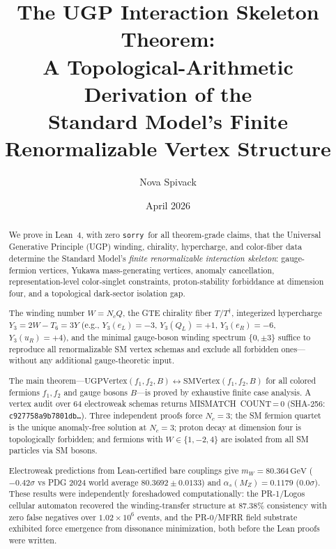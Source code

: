 \documentclass[12pt]{article}
\title{\textbf{The UGP Interaction Skeleton Theorem:\\
A Topological-Arithmetic Derivation of the\\
Standard Model's Finite Renormalizable Vertex Structure}}
\author{Nova Spivack}
\date{April 2026}
\theoremstyle{remark}
\newcommand{\sorry}{\texttt{sorry}}
\begin{document}
\maketitle
\NovaZenodoAfterTitle

\begin{abstract}
We prove in Lean~4, with zero \sorry\ for all theorem-grade claims, that the
Universal Generative Principle (UGP) winding, chirality, hypercharge, and
color-fiber data determine the Standard Model's \emph{finite renormalizable
interaction skeleton}: gauge-fermion vertices, Yukawa mass-generating vertices,
anomaly cancellation, representation-level color-singlet constraints,
proton-stability forbiddance at dimension four, and a topological dark-sector
isolation gap.

The winding number $W = N_cQ$, the GTE chirality fiber
$T/T^\dagger$, integerized hypercharge $Y_3 = 2W - T_6 = 3Y$ (e.g.,
$Y_3(e_L) = -3$, $Y_3(Q_L) = +1$, $Y_3(e_R) = -6$, $Y_3(u_R) = +4$), and
the minimal gauge-boson winding spectrum $\{0,\pm 3\}$ suffice to reproduce
all renormalizable SM vertex schemas and exclude all forbidden ones---without
any additional gauge-theoretic input.

The main theorem---$\mathrm{UGPVertex}(f_1,f_2,B) \leftrightarrow
\mathrm{SMVertex}(f_1,f_2,B)$ for all colored fermions $f_1,f_2$ and gauge
bosons $B$---is proved by exhaustive finite case analysis.  A vertex audit
over 64 electroweak schemas returns MISMATCH~COUNT\,=\,0 (SHA-256:
\texttt{c927758a9b7801db\ldots}).  Three independent proofs force $N_c = 3$;
the SM fermion quartet is the unique anomaly-free solution at $N_c = 3$; proton
decay at dimension four is topologically forbidden; and fermions with $W \in
\{1,-2,4\}$ are isolated from all SM particles via SM bosons.

Electroweak predictions from Lean-certified bare couplings give
$m_W = 80.364\,\mathrm{GeV}$ ($-0.42\sigma$ vs PDG 2024 world average
$80.3692 \pm 0.0133$) and $\alpha_s(M_Z) = 0.1179$ ($0.0\sigma$).  These
results were independently foreshadowed computationally: the PR-1/Logos
cellular automaton recovered the winding-transfer structure at 87.38\%
consistency with zero false negatives over $1.02 \times 10^6$ events, and the
PR-0/MFRR field substrate exhibited force emergence from dissonance
minimization, both before the Lean proofs were written.
\end{abstract}

\tableofcontents
\newpage
\end{document}
